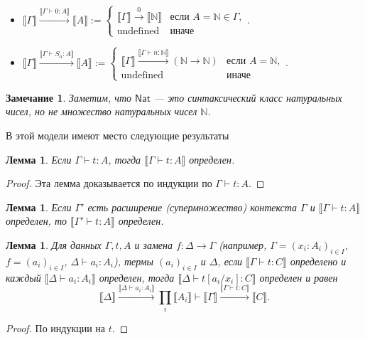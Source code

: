 \documentclass[openany]{book}
\theoremstyle{plain}
\newtheorem{lem}[thm]{Лемма}
\newtheorem{note}{Замечание}[section]
\theoremstyle{definition}
\newcommand{\N}{\mathbb{N}}
\newcommand{\nat}{\mathsf{Nat}}
\begin{document}
\begin{itemize}
    \item \(\llbracket \Gamma \rrbracket \overset{\llbracket \Gamma \vdash 0 : A \rrbracket}{\longrightarrow} \llbracket A \rrbracket := \begin{cases}\llbracket \Gamma \rrbracket \overset{0}{\longrightarrow} \llbracket \N \rrbracket & \text{если }A=\N \in \Gamma,\\ \text{undefined} & \text{иначе}\end{cases}.\)

    \item \(\llbracket \Gamma \rrbracket \overset{\llbracket \Gamma \vdash S_n : A \rrbracket}{\longrightarrow} \llbracket A \rrbracket := \begin{cases}\llbracket \Gamma \rrbracket \overset{\llbracket \Gamma \vdash n : \N \rrbracket}{\longrightarrow} (\N \to \N) & \text{если }A = \N,\\ \text{undefined} & \text{иначе}\end{cases}.\)
\end{itemize}

\begin{note}
Заметим, что \(\nat\) --- это синтаксический класс натуральных чисел, но не множество натуральных чисел \(\N\). 
\end{note}

В этой модели имеют место следующие результаты
\begin{lem}
Если \(\Gamma \vdash t : A\), тогда \(\llbracket \Gamma \vdash t : A \rrbracket\) определен.
\end{lem}
\begin{proof}
Эта лемма доказывается по индукции по \(\Gamma \vdash t : A\).
\end{proof}

\begin{lem}
Если \(\Gamma'\)  есть расширение (супермножество) контекста \(\Gamma\) и \(\llbracket \Gamma \vdash t : A \rrbracket\) определен, то \(\llbracket \Gamma' \vdash t : A \rrbracket\) определен.
\end{lem}

\begin{lem}
Для данных \(\Gamma, t, A\) и замена \(f : \Delta \to \Gamma\) (например, \(\Gamma = (x_i : A_i)_{i \in I}\), \(f = (a_i)_{i \in I}\), \(\Delta \vdash a_i : A_i\)), термы \((a_i)_{i \in I}\) и \(\Delta\), если \(\llbracket \Gamma \vdash t : C \rrbracket\) определено и каждый \(\llbracket \Delta \vdash a_i : A_i \rrbracket\) определен, тогда \(\llbracket \Delta \vdash t[a_i/x_i] : C \rrbracket\) определен и равен \[\llbracket \Delta \rrbracket \overset{\llbracket \Delta \vdash a_i : A_i \rrbracket}{\longrightarrow} \prod_i \llbracket A_i \rrbracket \vdash \llbracket \Gamma \rrbracket \overset{\llbracket \Gamma \vdash t : C \rrbracket}{\longrightarrow} \llbracket C \rrbracket.\]
\end{lem}
\begin{proof}
По индукции на \(t\).
\end{proof}
\end{document}
